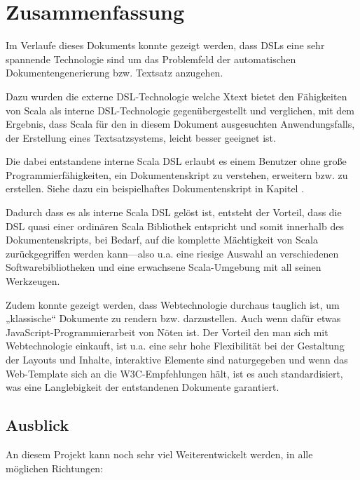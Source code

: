 \chapter{Zusammenfassung}

Im Verlaufe dieses Dokuments konnte gezeigt werden, dass DSLs eine sehr
spannende Technologie sind um das Problemfeld der automatischen
Dokumentengenerierung bzw. Textsatz anzugehen.

Dazu wurden die externe DSL-Technologie welche Xtext bietet den Fähigkeiten
von Scala als interne DSL-Technologie gegenübergestellt und verglichen,
mit dem Ergebnis, dass Scala für den in diesem Dokument ausgesuchten
Anwendungsfalls, der Erstellung eines Textsatzsystems,
leicht besser geeignet ist.

Die dabei entstandene interne Scala DSL erlaubt es einem Benutzer ohne große Programmierfähigkeiten, ein Dokumentenskript zu verstehen, erweitern
bzw. zu erstellen.
Siehe dazu ein beispielhaftes Dokumentenskript in Kapitel \label{sec-resultat}.

Dadurch dass es als interne Scala DSL gelöst ist, entsteht der Vorteil,
dass die DSL quasi einer ordinären Scala Bibliothek entspricht und
somit innerhalb des Dokumentenskripts, bei Bedarf,
auf die komplette Mächtigkeit von Scala
zurückgegriffen werden kann---also u.a. eine riesige Auswahl an verschiedenen
Softwarebibliotheken und eine erwachsene Scala-Umgebung mit all seinen Werkzeugen.

Zudem konnte gezeigt werden, dass Webtechnologie durchaus tauglich ist, um
„klassische“ Dokumente zu rendern bzw. darzustellen. Auch wenn dafür etwas
JavaScript-Programmierarbeit von Nöten ist. Der Vorteil den man sich mit
Webtechnologie einkauft, ist u.a. eine sehr hohe Flexibilität bei der
Gestaltung der Layouts und Inhalte, interaktive Elemente sind naturgegeben
und wenn das Web-Template sich an die W3C-Empfehlungen hält, ist es auch
standardisiert, was eine Langlebigkeit der entstandenen Dokumente garantiert.

\section{Ausblick}

An diesem Projekt kann noch sehr viel Weiterentwickelt werden, in alle
möglichen Richtungen:

